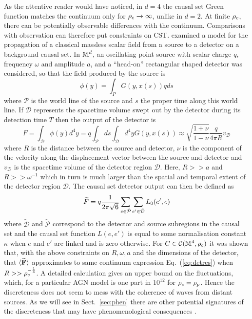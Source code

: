 As the attentive reader would have noticed, in $d=4$ the causal set Green function matches the continuum only for $\rho_c
\rightarrow \infty$, unlike in $d=2$. At finite $\rho_c$,  there  can be potentially observable
differences with the continuum. Comparisons with observation can therefore  put constraints on CST. \cite{dhstwo}  examined
a model for the propagation of a classical massless scalar field from a source to a
detector on a background causal set. In $\mathbb M^d$, an oscillating point source 
with scalar charge $q$, frequency $\omega$ and amplitude $a$, and a ``head-on'' rectangular shaped detector  
was considered, so that the  field produced by the source is 
\begin{equation} 
\phi(y)=\int_P G(y,x(s)) q ds
\end{equation} 
where $\mathcal P$ is the world line of the source and $s$ the proper time along this world line. If $\mathcal{D}$ represents the
spacetime volume swept out  by the detector during its detection time $T$ then the output of the detector is 
\begin{equation} 
F= \int_{\mathcal{D}} \phi(y) d^4y= q\int_{\mathcal P} ds \int_{\mathcal{D}} d^4y  G(y,x(s)) \approx \sqrt{\frac{1+\nu}{1-\nu}}
\frac{q}{4 \pi R} v_{\mathcal{D}}
\label{eq:detres}
\end{equation}  
where $R$ is the distance between the source and detector,  $\nu$ is the component of the velocity along the
displacement vector between the source and detector and $v_{\mathcal{D}}$ is the spacetime volume of the detector region
$\mathcal D$. Here, $R>>a$ and  $R >> \omega^{-1}$ which in turn is much larger than  the spatial and temporal extent of the detector region
$\mathcal D$. The causal set detector output can then be defined as 
\begin{equation} 
\widetilde F = q\frac{1}{2\pi \sqrt{6}}\sum_{e \in \tilde{\mathcal P} }\sum_{e' \in \tilde{\mathcal D}}L_0(e',e)
\end{equation}   
where $\tilde{\mathcal D} $ and $\tilde{\mathcal P}$ correspond to the detector and source subregions in the causal set
and the causal set function $L(e,e')$ is equal to some normalisation constant $\kappa$ when $e$ and $e' $ are linked and
is zero otherwise. For $C \in
\mathcal C(\mathbb M^4,\rho_c) $ it was shown that,  with the above constraints on $R, \omega, a$ and the dimensions of the detector,
that $\langle {\mathbf{\widetilde F}} \rangle$  approximates to  same continuum expression
Eq.~(\ref{eq:detres}) when $R>> \rho_c^{-\frac{1}{4}}$. A detailed calculation gives an  upper bound  on the
fluctuations, which,  for a particular AGN model is one  part in $10^{12}$ for $\rho_c=\rho_p$. Hence the discreteness does not seem to mess
with the coherence of waves from distant sources. As we will see in Sect.~\ref{sec:phen}  there are other potential signatures of the
discreteness that may have phenomenological consequences \citep{swerves,lambdaone,lambdatwo,lambdathree}. 


